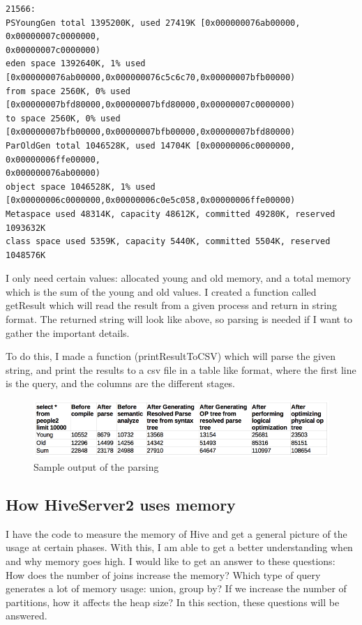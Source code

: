 \begin{lstlisting}
21566:
PSYoungGen total 1395200K, used 27419K [0x000000076ab00000, 0x00000007c0000000,
0x00000007c0000000)
eden space 1392640K, 1% used
[0x000000076ab00000,0x000000076c5c6c70,0x00000007bfb00000)
from space 2560K, 0% used [0x00000007bfd80000,0x00000007bfd80000,0x00000007c0000000)
to space 2560K, 0% used [0x00000007bfb00000,0x00000007bfb00000,0x00000007bfd80000)
ParOldGen total 1046528K, used 14704K [0x00000006c0000000, 0x00000006ffe00000,
0x000000076ab00000)
object space 1046528K, 1% used
[0x00000006c0000000,0x00000006c0e5c058,0x00000006ffe00000)
Metaspace used 48314K, capacity 48612K, committed 49280K, reserved 1093632K
class space used 5359K, capacity 5440K, committed 5504K, reserved 1048576K
\end{lstlisting}

I only need certain values: allocated young and old memory, and a total memory which is the sum of the young and old values. I created a function called getResult which will read the result from a given process and return in string format. The returned string will look like above, so parsing is needed if I want to gather the important details.

To do this, I made a function (printResultToCSV) which will parse the given string, and print the results to a csv file in a table like format, where the first line is the query, and the columns are the different stages.

\begin{figure}[H]
	\includegraphics[width=150mm, keepaspectratio]{figures/parse_output.png}
	\centering
	\caption{Sample output of the parsing}
\end{figure}


\subsection{How HiveServer2 uses memory}
I have the code to measure the memory of Hive and get a general picture of the usage at certain phases. With this, I am able to get a better understanding when and why memory goes high. I would like to get an answer to these questions: How does the number of joins increase the memory? Which type of query generates a lot of memory usage: union, group by? If we increase the number of partitions, how it affects the heap size? In this section, these questions will be answered.


